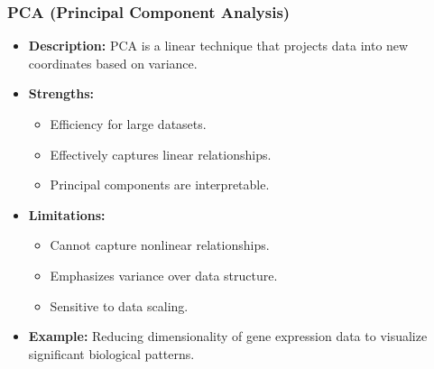 \documentclass[aspectratio=169]{beamer}
\begin{document}
\begin{frame}[fragile]
    \frametitle{PCA (Principal Component Analysis)}
    
    \begin{itemize}
        \item \textbf{Description:} 
            PCA is a linear technique that projects data into new coordinates based on variance.
        
        \item \textbf{Strengths:}
            \begin{itemize}
                \item Efficiency for large datasets.
                \item Effectively captures linear relationships.
                \item Principal components are interpretable.
            \end{itemize}
        
        \item \textbf{Limitations:}
            \begin{itemize}
                \item Cannot capture nonlinear relationships.
                \item Emphasizes variance over data structure.
                \item Sensitive to data scaling.
            \end{itemize}
        
        \item \textbf{Example:} 
            Reducing dimensionality of gene expression data to visualize significant biological patterns.
    \end{itemize}
\end{frame}
\end{document}
